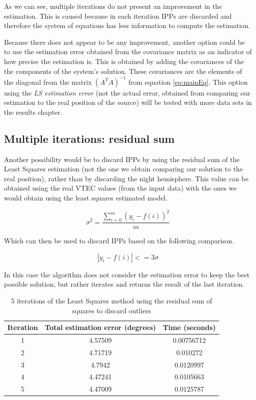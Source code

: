 As we can see, multiple iterations do not present an improvement in the estimation. This is caused because in each iteration IPPs are discarded and therefore the system of equations has less information to compute the estimation.

Because there does not appear to be any improvement, another option could be to use the estimation error obtained from the covariance matrix as an indicator of how precise the estimation is. This is obtained by adding the covariances of the the components of the system's solution. These covariances are the elements of the diagonal from the matrix $(A^{T}A)^{-1}$ from equation \ref{eq:mainEq}. This option using the \textit{LS estimation error} (not the actual error, obtained from comparing our estimation to the real position of the source) will be tested with more data sets in the results chapter.

\subsection{Multiple iterations: residual sum}

Another possibility would be to discard IPPs by using the residual sum of the Least Squares estimation (not the one we obtain comparing our solution to the real position), rather than by discarding the night hemisphere. This value can be obtained using the real VTEC values (from the input data) with the ones we would obtain using the least squares estimated model.

\begin{equation} \label{eq:residual}
\sigma^{2} = \frac{\sum_{i = 0}^{m}(y_{i}-f(i))^{2}}{m}
\end{equation}

Which can then be used to discard IPPs based on the following comparison.

\begin{equation} \label{eq:discard}
|y_{i}-f(i)| <= 3\sigma
\end{equation}

In this case the algorithm does not consider the estimation error to keep the best possible solution, but rather iterates and returns the result of the last iteration.

\begin{table}[h!]
	\centering
	\def\arraystretch{1.2}
	\begin{tabular}{|c c c|} 
		\hline
		Iteration & Total estimation error (degrees) & Time (seconds) \\ [0.5ex] 
		\hline\hline
		1  & 4.57509 & 0.00756712 \\
		\hline
		2  & 4.71719 & 0.010272 \\
		\hline
		3  & 4.7942 & 0.0120997 \\
		\hline
		4  & 4.47241 & 0.0105663 \\
		\hline
		5  & 4.47009 & 0.0125787 \\
		\hline
	\end{tabular}
	\caption{5 iterations of the Least Squares method using the residual sum of squares to discard outliers}
\end{table}

